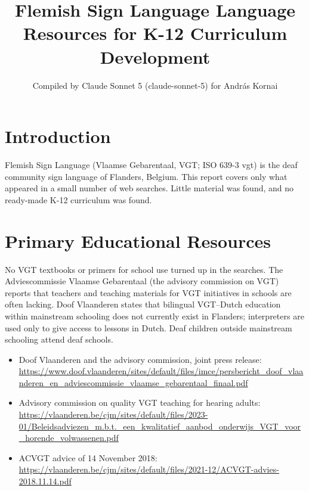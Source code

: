 \documentclass[12pt]{article}
\title{Flemish Sign Language Language Resources for K-12 Curriculum Development}
\author{Compiled by Claude Sonnet 5 (claude-sonnet-5) for Andr\'as Kornai}
\date{}
\begin{document}
\maketitle

\section{Introduction}
Flemish Sign Language (Vlaamse Gebarentaal, VGT; ISO 639-3 vgt) is the deaf community sign language of Flanders, Belgium. This report covers only what appeared in a small number of web searches. Little material was found, and no ready-made K-12 curriculum was found.

\section{Primary Educational Resources}
No VGT textbooks or primers for school use turned up in the searches. The Adviescommissie Vlaamse Gebarentaal (the advisory commission on VGT) reports that teachers and teaching materials for VGT initiatives in schools are often lacking. Doof Vlaanderen states that bilingual VGT--Dutch education within mainstream schooling does not currently exist in Flanders; interpreters are used only to give access to lessons in Dutch. Deaf children outside mainstream schooling attend deaf schools.
\begin{itemize}
\item Doof Vlaanderen and the advisory commission, joint press release: \url{https://www.doof.vlaanderen/sites/default/files/imce/persbericht_doof_vlaanderen_en_adviescommissie_vlaamse_gebarentaal_finaal.pdf}
\item Advisory commission on quality VGT teaching for hearing adults: \url{https://vlaanderen.be/cjm/sites/default/files/2023-01/Beleidsadviezen_m.b.t._een_kwalitatief_aanbod_onderwijs_VGT_voor_horende_volwassenen.pdf}
\item ACVGT advice of 14 November 2018: \url{https://vlaanderen.be/cjm/sites/default/files/2021-12/ACVGT-advies-2018.11.14.pdf}
\end{itemize}
\end{document}
